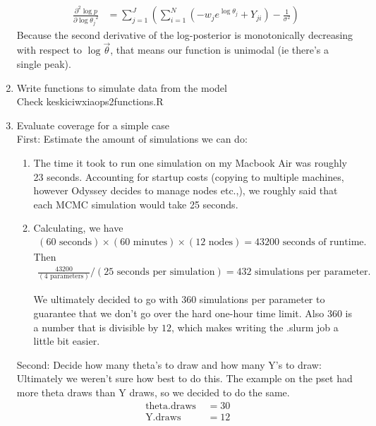 \documentclass[paper=a4, fontsize=11pt]{scrartcl}
\newcommand{\parens}[1]{ \left( #1 \right) }
\begin{document}
\begin{enumerate}
\begin{align*}
{{            }
          } \\
        \frac{\partial^2{\log{p}}}{\partial{\log{\theta_j}}^2}
          &= \sum_{j=1}^J{
            \parens{
              \sum_{i=1}^N{ \parens{
                -w_je^{\log{\theta_j}} + Y_{ji}
              }}
              - \frac{1}{\sigma^2}
            }
          }
      \end{align*}
      Because the second derivative of the log-posterior is monotonically decreasing with respect to $\log{\vec{\theta}}$, that means our function is unimodal (ie there's a single peak).
    \item Write functions to simulate data from the model \\
      Check keskici\textunderscore wxiao\textunderscore ps2\textunderscore functions.R
    \item Evaluate coverage for a simple case \\

      First: Estimate the amount of simulations we can do:
        \begin{enumerate}
          \item The time it took to run one simulation on my Macbook Air was roughly 23 seconds. Accounting for startup costs (copying to multiple machines, however Odyssey decides to manage nodes etc.,), we roughly said that each MCMC simulation would take 25 seconds.
          \item Calculating, we have
            \begin{align*}
              (60 \text{ seconds}) \times (60 \text{ minutes}) \times (12 \text{ nodes}) = 43200 \text{ seconds of runtime.}
            \end{align*}
              Then
            \begin{align*}
              \frac{43200}{(4 \text{ parameters})} / (25 \text{ seconds per simulation}) = 432 \text{ simulations per parameter.}
            \end{align*}

          We ultimately decided to go with $360$ simulations per parameter to guarantee that we don't go over the hard one-hour time limit. Also $360$ is a number that is divisible by $12$, which makes writing the .slurm job a little bit easier.
        \end{enumerate}

      Second: Decide how many theta's to draw and how many Y's to draw: \\
        Ultimately we weren't sure how best to do this. The example on the pset had more theta draws than Y draws, so we decided to do the same.
        \begin{align*}
          \text{ theta.draws } &= 30 \\
          \text{ Y.draws } &= 12
        \end{align*}
  \end{enumerate}
\end{document}
